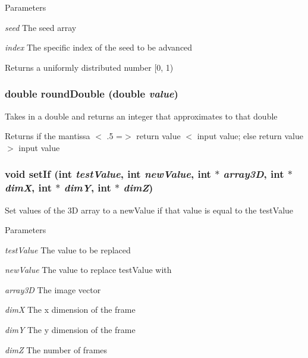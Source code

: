 \begin{DoxyParams}{Parameters}
\item[{\em seed}]The seed array \item[{\em index}]The specific index of the seed to be advanced \end{DoxyParams}
\begin{DoxyReturn}{Returns}
a uniformly distributed number \mbox{[}0, 1) 
\end{DoxyReturn}
\hypertarget{ex__particle__CUDA__naive__full_8cu_a8b9e6dd1f65d08f3f2537574b12f7fe5}{
\subsubsection[{roundDouble}]{\setlength{\rightskip}{0pt plus 5cm}double roundDouble (double {\em value})}}
\label{ex__particle__CUDA__naive__full_8cu_a8b9e6dd1f65d08f3f2537574b12f7fe5}
Takes in a double and returns an integer that approximates to that double \begin{DoxyReturn}{Returns}
if the mantissa $<$ .5 =$>$ return value $<$ input value; else return value $>$ input value 
\end{DoxyReturn}
\hypertarget{ex__particle__CUDA__naive__full_8cu_a0ee0664eb7123e026513e7cf19ba3434}{
\subsubsection[{setIf}]{\setlength{\rightskip}{0pt plus 5cm}void setIf (int {\em testValue}, \/  int {\em newValue}, \/  int $\ast$ {\em array3D}, \/  int $\ast$ {\em dimX}, \/  int $\ast$ {\em dimY}, \/  int $\ast$ {\em dimZ})}}
\label{ex__particle__CUDA__naive__full_8cu_a0ee0664eb7123e026513e7cf19ba3434}
Set values of the 3D array to a newValue if that value is equal to the testValue 
\begin{DoxyParams}{Parameters}
\item[{\em testValue}]The value to be replaced \item[{\em newValue}]The value to replace testValue with \item[{\em array3D}]The image vector \item[{\em dimX}]The x dimension of the frame \item[{\em dimY}]The y dimension of the frame \item[{\em dimZ}]The number of frames \end{DoxyParams}

